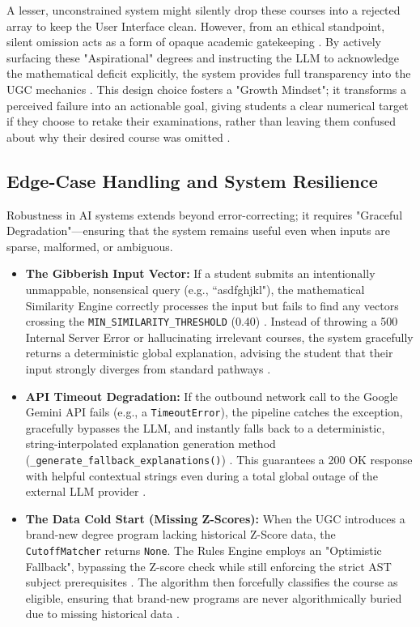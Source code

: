 \documentclass[conference]{IEEEtran}
\begin{document}
A lesser, unconstrained system might silently drop these courses into a rejected array to keep the User Interface clean. However, from an ethical standpoint, silent omission acts as a form of opaque academic gatekeeping \cite{wang2023finding}. By actively surfacing these "Aspirational" degrees and instructing the LLM to acknowledge the mathematical deficit explicitly, the system provides full transparency into the UGC mechanics \cite{ugc2024overview}. This design choice fosters a "Growth Mindset"; it transforms a perceived failure into an actionable goal, giving students a clear numerical target if they choose to retake their examinations, rather than leaving them confused about why their desired course was omitted \cite{vozniuk2025teacher}.

\subsection{Edge-Case Handling and System Resilience}
Robustness in AI systems extends beyond error-correcting; it requires "Graceful Degradation"—ensuring that the system remains useful even when inputs are sparse, malformed, or ambiguous.
\begin{itemize}
    \item \textbf{The Gibberish Input Vector:} If a student submits an intentionally unmappable, nonsensical query (e.g., ``asdfghjkl"), the mathematical Similarity Engine correctly processes the input but fails to find any vectors crossing the \texttt{MIN\_SIMILARITY\_THRESHOLD} ($0.40$) \cite{silva2026systematic}. Instead of throwing a 500 Internal Server Error or hallucinating irrelevant courses, the system gracefully returns a deterministic global explanation, advising the student that their input strongly diverges from standard pathways \cite{almadani2023recommender}.
    \item \textbf{API Timeout Degradation:} If the outbound network call to the Google Gemini API fails (e.g., a \texttt{TimeoutError}), the pipeline catches the exception, gracefully bypasses the LLM, and instantly falls back to a deterministic, string-interpolated explanation generation method (\texttt{\_generate\_fallback\_explanations()}) \cite{ieee2026adaptiveui}. This guarantees a 200 OK response with helpful contextual strings even during a total global outage of the external LLM provider \cite{springer2024genai_sl}.
    \item \textbf{The Data Cold Start (Missing Z-Scores):} When the UGC introduces a brand-new degree program lacking historical Z-Score data, the \texttt{CutoffMatcher} returns \texttt{None}. The Rules Engine employs an "Optimistic Fallback", bypassing the Z-score check while still enforcing the strict AST subject prerequisites \cite{tarus2018matrix}. The algorithm then forcefully classifies the course as eligible, ensuring that brand-new programs are never algorithmically buried due to missing historical data \cite{bakhshinategh2023course}.
\end{itemize}
\end{document}
